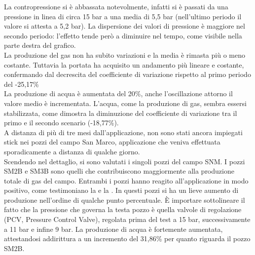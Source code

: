 La contropressione si è abbassata notevolmente, infatti si è passati da una pressione in linea di circa 15 bar a una media di 5,5 bar (nell'ultimo periodo il valore si attesta a 5,2 bar). La dispersione dei valori di pressione è maggiore nel secondo periodo:  l'effetto tende però a diminuire nel tempo, come visibile nella parte destra del grafico.\\
La produzione del gas non ha subito variazioni e la media è rimasta più o meno costante. Tuttavia la portata ha acquisito un andamento più lineare e costante, confermando dal decrescita del coefficiente di variazione rispetto al primo periodo del -25,17\% \\
La produzione di acqua è aumentata del 20\%, anche l'oscillazione attorno il valore medio è incrementata. L'acqua, come la produzione di gas, sembra essersi stabilizzata, come dimostra la diminuzione del coefficiente di variazione tra il primo e il secondo scenario (-18,77\%).\\
A distanza di più di tre mesi dall'applicazione, non sono stati ancora impiegati stick nei pozzi del campo San Marco, applicazione che veniva effettuata sporadicamente a distanza di qualche giorno.\\
Scendendo nel dettaglio, si sono valutati i singoli pozzi del campo SNM. I pozzi SM2B e SM3B sono quelli che contribuiscono maggiormente alla produzione totale di gas del campo. Entrambi i pozzi hanno reagito all'applicazione in modo positivo, come testimoniano la  e la . In questi pozzi si ha un lieve aumento di produzione nell'ordine di qualche punto percentuale. È importare sottolineare il fatto che la pressione che governa la testa pozzo è quella valvole di regolazione (PCV, Pressure Control Valve), regolata prima del test a 15 bar, successivamente a 11 bar e infine 9 bar. La produzione di acqua è fortemente aumentata, attestandosi addirittura a un incremento del 31,86\% per quanto riguarda il pozzo SM2B.

